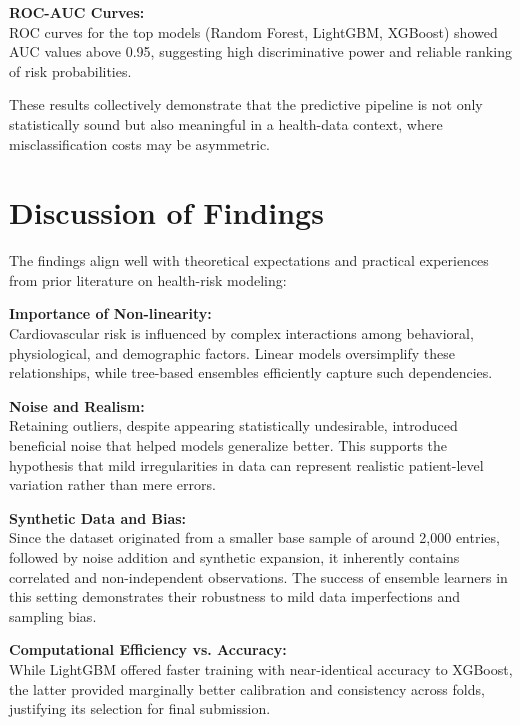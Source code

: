 \textbf{ROC-AUC Curves:}\\
ROC curves for the top models (Random Forest, LightGBM, XGBoost) showed AUC values above 0.95, suggesting high discriminative power and reliable ranking of risk probabilities.


These results collectively demonstrate that the predictive pipeline is not only statistically sound but also meaningful in a health-data context, where misclassification costs may be asymmetric.


\section{Discussion of Findings}\label{sec:discussion-of-findings}

The findings align well with theoretical expectations and practical experiences from prior literature on health-risk modeling:

\textbf{Importance of Non-linearity:}\\
Cardiovascular risk is influenced by complex interactions among behavioral, physiological, and demographic factors.
Linear models oversimplify these relationships, while tree-based ensembles efficiently capture such dependencies.

\textbf{Noise and Realism:}\\
Retaining outliers, despite appearing statistically undesirable, introduced beneficial noise that helped models generalize better.
This supports the hypothesis that mild irregularities in data can represent realistic patient-level variation rather than mere errors.

\textbf{Synthetic Data and Bias:}\\
Since the dataset originated from a smaller base sample of around 2,000 entries, followed by noise addition and synthetic expansion, it inherently contains correlated and non-independent observations.
The success of ensemble learners in this setting demonstrates their robustness to mild data imperfections and sampling bias.

\textbf{Computational Efficiency vs. Accuracy:}\\
While LightGBM offered faster training with near-identical accuracy to XGBoost, the latter provided marginally better calibration and consistency across folds, justifying its selection for final submission.


